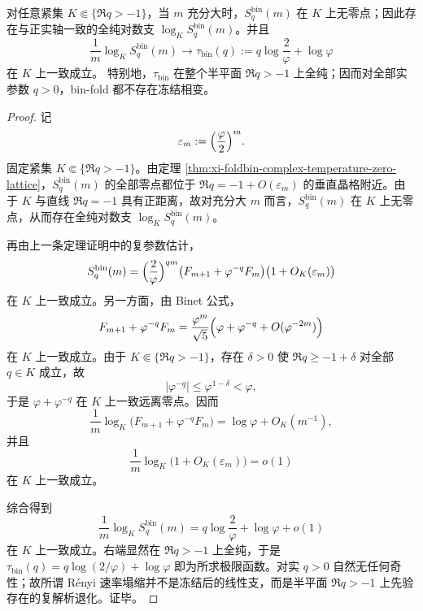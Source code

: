 \begin{corollary}\label{cor:xi-foldbin-positive-halfplane-no-freezing}
对任意紧集 \(K\Subset\{\Re q>-1\}\)，当 \(m\) 充分大时，\(S_q^{\mathrm{bin}}(m)\) 在 \(K\) 上无零点；因此存在与正实轴一致的全纯对数支 \(\log_K S_q^{\mathrm{bin}}(m)\)。并且
\[
\frac{1}{m}\log_K S_q^{\mathrm{bin}}(m)
\longrightarrow
\tau_{\mathrm{bin}}(q):=
q\log\frac{2}{\varphi}+\log\varphi
\]
在 \(K\) 上一致成立。
特别地，\(\tau_{\mathrm{bin}}\) 在整个半平面 \(\Re q>-1\) 上全纯；因而对全部实参数 \(q>0\)，bin-fold 都不存在冻结相变。
\end{corollary}
\begin{proof}
记
\[
\varepsilon_m:=\Bigl(\frac{\varphi}{2}\Bigr)^m.
\]
固定紧集 \(K\Subset\{\Re q>-1\}\)。由定理 \ref{thm:xi-foldbin-complex-temperature-zero-lattice}，\(S_q^{\mathrm{bin}}(m)\) 的全部零点都位于 \(\Re q=-1+O(\varepsilon_m)\) 的垂直晶格附近。由于 \(K\) 与直线 \(\Re q=-1\) 具有正距离，故对充分大 \(m\) 而言，\(S_q^{\mathrm{bin}}(m)\) 在 \(K\) 上无零点，从而存在全纯对数支 \(\log_K S_q^{\mathrm{bin}}(m)\)。

再由上一条定理证明中的复参数估计，
\[
S_q^{\mathrm{bin}}(m)
=
\Bigl(\frac{2}{\varphi}\Bigr)^{qm}
\bigl(F_{m+1}+\varphi^{-q}F_m\bigr)\bigl(1+O_K(\varepsilon_m)\bigr)
\]
在 \(K\) 上一致成立。另一方面，由 Binet 公式，
\[
F_{m+1}+\varphi^{-q}F_m
=
\frac{\varphi^m}{\sqrt5}\Bigl(\varphi+\varphi^{-q}+O(\varphi^{-2m})\Bigr)
\]
在 \(K\) 上一致成立。由于 \(K\Subset\{\Re q>-1\}\)，存在 \(\delta>0\) 使 \(\Re q\ge -1+\delta\) 对全部 \(q\in K\) 成立，故
\[
|\varphi^{-q}|\le \varphi^{1-\delta}<\varphi,
\]
于是 \(\varphi+\varphi^{-q}\) 在 \(K\) 上一致远离零点。因而
\[
\frac{1}{m}\log_K\!\bigl(F_{m+1}+\varphi^{-q}F_m\bigr)
=
\log\varphi+O_K(m^{-1}),
\]
并且
\[
\frac{1}{m}\log_K\!\bigl(1+O_K(\varepsilon_m)\bigr)=o(1)
\]
在 \(K\) 上一致成立。

综合得到
\[
\frac{1}{m}\log_K S_q^{\mathrm{bin}}(m)
=
q\log\frac{2}{\varphi}
+\log\varphi+o(1)
\]
在 \(K\) 上一致成立。右端显然在 \(\Re q>-1\) 上全纯，于是 \(\tau_{\mathrm{bin}}(q)=q\log(2/\varphi)+\log\varphi\) 即为所求极限函数。对实 \(q>0\) 自然无任何奇性；故所谓 Rényi 速率塌缩并不是冻结后的线性支，而是半平面 \(\Re q>-1\) 上先验存在的复解析退化。证毕。
\end{proof}

